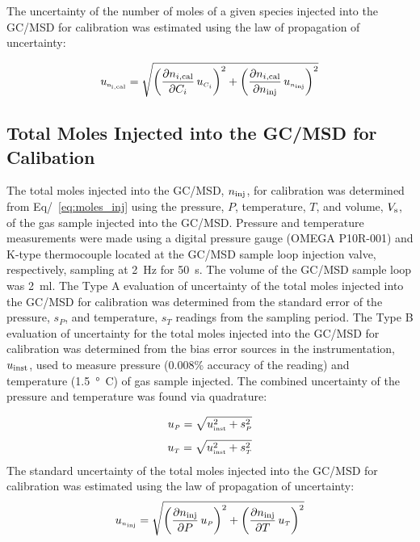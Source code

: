 \documentclass[12pt]{article}
\begin{document}
The uncertainty of the number of moles of a given species injected into the GC/MSD for calibration was estimated using the law of propagation of uncertainty:

\begin{equation}
\label{eq:Given_Moles_Cal_Uncertainty}
 u_{\rm \scriptscriptstyle n_{i,\rm cal}} = \sqrt{{\left( \frac{\partial n_{i,\rm cal}}{\partial C_{i}}\,u_{\scriptscriptstyle C_{i}} \right)}^2+{\left(\frac{\partial n_{i,\rm cal}}{\partial n_{\rm inj}}\,u_{\scriptscriptstyle n_{\rm inj}}\right)}^2}
\end{equation}

\subsection{Total Moles Injected into the GC/MSD for Calibation}
\label{ssec:Total Moles Injected into the GC/MSD for Calibation}

The total moles injected into the GC/MSD, $ n_{\rm inj}$, for calibration was determined from Eq/~\ref{eq:moles_inj} using the pressure, $P$, temperature, $T$, and volume, $V_{\rm s}$, of the gas sample injected into the GC/MSD. Pressure and temperature measurements were made using a digital pressure gauge (OMEGA P10R-001) and K-type thermocouple located at the GC/MSD sample loop injection valve, respectively, sampling at \SI{2}{Hz} for \SI{50}{s}. The volume of the GC/MSD sample loop was \SI{2}{ml}. The Type A evaluation of uncertainty of the total moles injected into the GC/MSD for calibration was determined from the standard error of the pressure, $s_{P}$, and temperature, $s_{T}$ readings from the sampling period. The Type B evaluation of uncertainty for the total moles injected into the GC/MSD for calibration was determined from the bias error sources in the instrumentation, $u_{\rm inst}$, used to measure pressure (0.008\% accuracy of the reading) and temperature (\SI{1.5}{\degree C}) of gas sample injected. The combined uncertainty of the pressure and temperature was found via quadrature:

\begin{equation}
\label{eq:pressure_uncertainty}
u_{\scriptscriptstyle P} = \sqrt{ u_{\rm \scriptscriptstyle inst}^2 + s_{\scriptscriptstyle P}^2}
\end{equation}
\begin{equation}
\label{eq:temp_uncertainty}
u_{\scriptscriptstyle T} = \sqrt{ u_{\rm \scriptscriptstyle inst}^2 + s_{\scriptscriptstyle T}^2}
\end{equation}
The standard uncertainty of the total moles injected into the GC/MSD for calibration was estimated using the law of propagation of uncertainty:
\begin{equation}
\label{eq:moles_injected_uncertainty}
u_{\scriptscriptstyle n_{\rm inj}} = \sqrt{{\left( \frac{\partial n_{\rm inj}}{\partial P}\,u_{\scriptscriptstyle P} \right) }^2+{\left(\frac{\partial n_{\rm inj}}{\partial T}\,u_{\scriptscriptstyle T}\right)}^2}
\end{equation}
\end{document}
